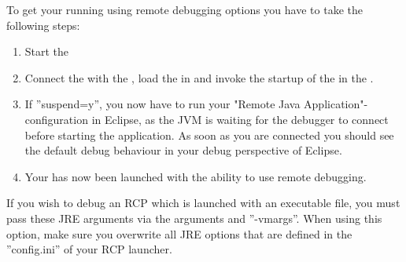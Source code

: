 To get your \gdaut{} running using remote debugging options you have to take the following steps:
\begin{enumerate}
 \item Start the \gdagent{}
 \item Connect the \ite{} with the \gdagent{}, load the \gdproject{} in \app{} and invoke the startup of the \gdaut{} in the \ite{}.
 \item If ''suspend=y'', you now have to run your "Remote Java Application"-configuration 
 in Eclipse, as the JVM is waiting for the debugger to connect before starting the 
 application. As soon as you are connected you should see the default debug behaviour in your
 debug perspective of Eclipse.
 \item Your \gdaut{} has now been launched with the ability to use remote debugging.  
\end{enumerate}

If you wish to debug an RCP \gdaut{}  which is launched with an 
executable file, you must pass these JRE arguments via the \gdaut{} arguments and ''-vmargs''. When using this option, make sure you overwrite all JRE options that are defined in the ''config.ini'' of your RCP launcher.
